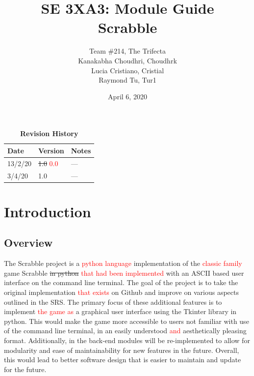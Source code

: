 \documentclass[12pt, titlepage]{article}
\title{SE 3XA3: Module Guide \\ Scrabble}
\author{Team \#214, The Trifecta
		\\ Kanakabha Choudhri, Choudhrk
		\\ Lucia Cristiano, Cristial
		\\ Raymond Tu, Tur1
}
\date{April 6, 2020}
\begin{document}
\maketitle

\tableofcontents
\listoftables
\listoffigures

\begin{table}[bp]
\caption{\bf Revision History}
\begin{tabularx}{\textwidth}{p{3cm}p{2cm}X}
\toprule {\bf Date} & {\bf Version} & {\bf Notes}\\
\midrule
13/2/20 & \sout{1.0}  \textcolor{red}{0.0} & ---\\
3/4/20 & 1.0 & ---\\
\bottomrule
\end{tabularx}
\end{table}

\newpage


\section{Introduction} %

\subsection{Overview}

The Scrabble project is a \textcolor{red}{python language} implementation of the \textcolor{red}{classic family} game Scrabble \sout{in python} \textcolor{red}{that had been implemented} with an ASCII based user interface on the command line terminal. The goal of the project is to take the original implementation \textcolor{red}{that exists} on Github and improve on various aspects outlined in the SRS. The primary focus of these additional features is to implement \textcolor{red}{the game as} a graphical user interface using the Tkinter library in python. This would make the game more accessible to users not familiar with use of the command line terminal, in an easily understood \textcolor{red}{and} aesthetically pleasing format. Additionally, in the back-end modules will be re-implemented to allow for modularity and ease of maintainability for new features in the future. Overall, this would lead to better software design that is easier to maintain and update for the future. 
\end{document}

